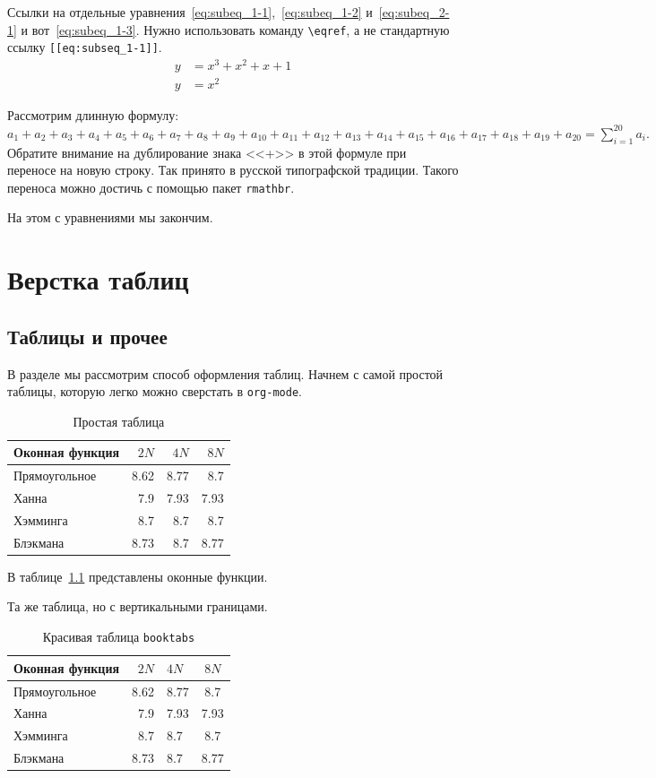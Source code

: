 \documentclass[12pt]{extreport}
\begin{document}
Ссылки на отдельные уравнения~\eqref{eq:subeq_1-1},~\eqref{eq:subeq_1-2} и~\eqref{eq:subeq_2-1} и вот~\eqref{eq:subeq_1-3}.
Нужно использовать команду \texttt{\textbackslash{}eqref}, а не стандартную ссылку \texttt{[[eq:subseq\_1-1]]}.
\begin{subequations}
\label{eq:subeq_2}
\begin{align}
        y & = x^3 + x^2 + x + 1\label{eq:subeq_2-1} \\
        y & = x^2
    \end{align}
\end{subequations}

Рассмотрим длинную формулу:
\(a_1+a_2+a_3+a_4+a_5+a_6+a_7+a_8+a_{9}+a_{10}+a_{11}+a_{12}+a_{13}+a_{14}+a_{15}+a_{16}+a_{17}+a_{18}+a_{19}+a_{20}=\sum_{i=1}^{20}a_{i}.\)
Обратите внимание на дублирование знака {}<<+>>{} в этой формуле при переносе на новую строку.
Так принято в русской типографской традиции.
Такого переноса можно достичь с помощью пакет \texttt{rmathbr}.

На этом с уравнениями мы закончим.
\chapter{Верстка таблиц}
\label{sec:orgc5d3b52}
\section{Таблицы и прочее}
\label{sec:orgbbba37c}
В разделе мы рассмотрим способ оформления таблиц.
Начнем с самой простой таблицы, которую легко можно сверстать в \texttt{org-mode}.
\begin{table}[htbp]
\caption{\label{tab:table1}Простая таблица}
\centering
\begin{tabular}{lrrr}
\hline
Оконная функция & \(2N\) & \(4N\) & \(8N\)\\
\hline
Прямоугольное & 8.62 & 8.77 & 8.7\\
\hline
Ханна & 7.9 & 7.93 & 7.93\\
\hline
Хэмминга & 8.7 & 8.7 & 8.7\\
\hline
Блэкмана & 8.73 & 8.7 & 8.77\\
\hline
\end{tabular}
\end{table}

В таблице~\ref{tab:table1} представлены оконные функции.

Та же таблица, но с вертикальными границами.

\begin{table}[htbp]
\caption{\label{tab:table2}Красивая таблица \texttt{booktabs}}
\centering
\begin{tabular}{|l|r|l|c|}
\toprule
\textbf{Оконная функция} & \textbf{\(2N\)} & \textbf{\(4N\)} & \textbf{\(8N\)}\\
\midrule
Прямоугольное & 8.62 & 8.77 & 8.7\\
Ханна & 7.9 & 7.93 & 7.93\\
Хэмминга & 8.7 & 8.7 & 8.7\\
Блэкмана & 8.73 & 8.7 & 8.77\\
\bottomrule
\end{tabular}
\end{table}
\end{document}
